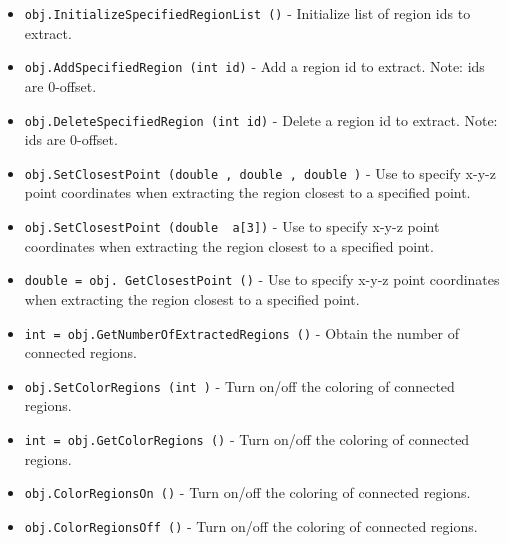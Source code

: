 \begin{itemize}
\item  \verb|obj.InitializeSpecifiedRegionList ()| -  Initialize list of region ids to extract.

\item  \verb|obj.AddSpecifiedRegion (int id)| -  Add a region id to extract. Note: ids are 0-offset.

\item  \verb|obj.DeleteSpecifiedRegion (int id)| -  Delete a region id to extract. Note: ids are 0-offset.

\item  \verb|obj.SetClosestPoint (double , double , double )| -  Use to specify x-y-z point coordinates when extracting the region 
 closest to a specified point.

\item  \verb|obj.SetClosestPoint (double  a[3])| -  Use to specify x-y-z point coordinates when extracting the region 
 closest to a specified point.

\item  \verb|double = obj. GetClosestPoint ()| -  Use to specify x-y-z point coordinates when extracting the region 
 closest to a specified point.

\item  \verb|int = obj.GetNumberOfExtractedRegions ()| -  Obtain the number of connected regions.

\item  \verb|obj.SetColorRegions (int )| -  Turn on/off the coloring of connected regions.

\item  \verb|int = obj.GetColorRegions ()| -  Turn on/off the coloring of connected regions.

\item  \verb|obj.ColorRegionsOn ()| -  Turn on/off the coloring of connected regions.

\item  \verb|obj.ColorRegionsOff ()| -  Turn on/off the coloring of connected regions.

\end{itemize}
